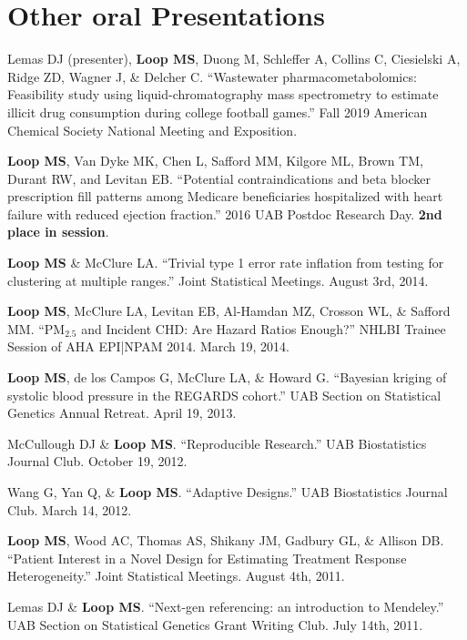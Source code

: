 \documentclass[10pt,letterpaper]{article}
\renewenvironment{itemize}{
  \begin{list}{}{
    \setlength{\leftmargin}{1.5em}
    \setlength{\itemsep}{0.25em}
    \setlength{\parskip}{0pt}
    \setlength{\parsep}{0.25em}
  }
}{
  \end{list}
}
\begin{document}
\section*{Other oral Presentations}
\begin{itemize}
\item Lemas DJ (presenter), \textbf{Loop MS}, Duong M, Schleffer A, Collins C, Ciesielski A, Ridge ZD, Wagner J, \& Delcher C. ``Wastewater pharmacometabolomics: Feasibility study using liquid-chromatography mass spectrometry to estimate illicit drug consumption during college football games.'' Fall 2019 American Chemical Society National Meeting and Exposition.
	\item \textbf{Loop MS}, Van Dyke MK, Chen L, Safford MM, Kilgore ML, Brown TM, Durant RW, and Levitan EB. ``Potential contraindications and beta blocker prescription fill patterns among Medicare beneficiaries hospitalized with heart failure with reduced ejection fraction.'' 2016 UAB Postdoc Research Day. \textbf{2nd place in session}.
	\item \textbf{Loop MS} \& McClure LA. ``Trivial type 1 error rate inflation from testing for clustering at multiple ranges.'' Joint Statistical Meetings. August 3rd, 2014.
	\item \textbf{Loop MS}, McClure LA, Levitan EB, Al-Hamdan MZ, Crosson WL, \& Safford MM. ``PM$_{2.5}$ and Incident CHD: Are Hazard Ratios Enough?'' NHLBI Trainee Session of AHA EPI|NPAM 2014. March 19, 2014.
	\item \textbf{Loop MS}, de los Campos G, McClure LA, \& Howard G. ``Bayesian kriging of systolic blood pressure in the REGARDS cohort.'' UAB Section on Statistical Genetics Annual Retreat. April 19, 2013. 
	\item McCullough DJ \& \textbf{Loop MS}. ``Reproducible Research.'' UAB Biostatistics Journal Club. October 19, 2012.
	\item Wang G, Yan Q, \& \textbf{Loop MS}. ``Adaptive Designs.'' UAB Biostatistics Journal Club. March 14, 2012.
	\item \textbf{Loop MS}, Wood AC, Thomas AS, Shikany JM, Gadbury GL, \& Allison DB. ``Patient Interest in a Novel Design for Estimating Treatment Response Heterogeneity.'' Joint Statistical Meetings. August 4th, 2011.
	\item Lemas DJ \& \textbf{Loop MS}. ``Next-gen referencing: an introduction to Mendeley.'' UAB Section on Statistical Genetics Grant Writing Club. July 14th, 2011.
\end{itemize}
\end{document}
